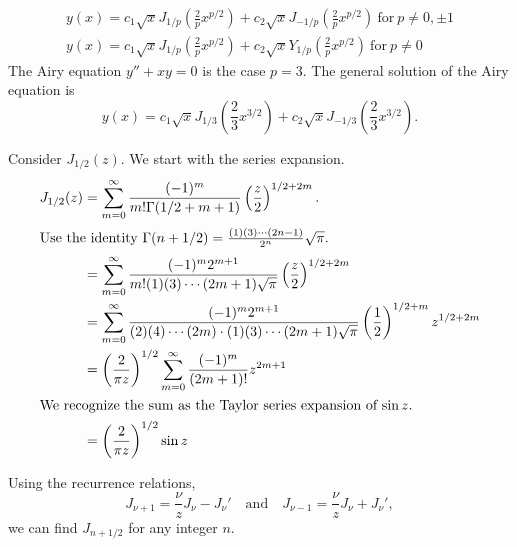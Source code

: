{\begin{Solution}
\begin{gather*}
    \boxed{
      y(x) = c_1 \sqrt{x} J_{1/p}\left( \frac{2}{p} x^{p/2} \right) 
      + c_2 \sqrt{x} J_{-1/p}\left( \frac{2}{p} x^{p/2} \right)\ \mathrm{for}\ p \neq 0,\pm 1
      }
    \\
    \boxed{
      y(x) = c_1 \sqrt{x} J_{1/p}\left( \frac{2}{p} x^{p/2} \right) 
      + c_2 \sqrt{x} Y_{1/p}\left( \frac{2}{p} x^{p/2} \right)\ \mathrm{for}\ p \neq 0
      }
  \end{gather*}
  The Airy equation $y'' + x y = 0$ is the case $p = 3$.  
  The general solution of the Airy equation is
  \[
  \boxed{
    y(x) = c_1 \sqrt{x} J_{1/3}\left( \frac{2}{3} x^{3/2} \right) 
    + c_2 \sqrt{x} J_{-1/3}\left( \frac{2}{3} x^{3/2} \right).
    }
  \]
\end{Solution}








\begin{Solution}
  Consider $J_{1/2}(z)$.  We start with the series expansion.
  \begin{align*}
    J_{1/2}(z)
    &= \sum_{m = 0}^\infty \frac{(-1)^m}{m! \Gamma(1/2 + m + 1)} \left( \frac{z}{2}
    \right)^{1/2 + 2m}. 
    \\
    \intertext{Use the identity $\Gamma(n+1/2) = \frac{(1)(3)\cdots(2n-1)}{2^n}
      \sqrt{\pi}$.}
    &= \sum_{m = 0}^\infty \frac{(-1)^m 2^{m+1}}{m! (1)(3)\cdots(2m+1) \sqrt{\pi}}
    \left(\frac{z}{2}\right)^{1/2+2m} 
    \\
    &= \sum_{m = 0}^\infty \frac{(-1)^m 2^{m+1}}{(2)(4)\cdots(2m) \cdot (1)(3)\cdots
      (2m+1) \sqrt{\pi}} \left(\frac{1}{2} \right)^{1/2 + m} z^{1/2 + 2m} 
    \\
    &= \left( \frac{2}{\pi z} \right)^{1/2} \sum_{m = 0}^\infty \frac{(-1)^m}{(2m+1)!} z^{2m+1} 
    \\
    \intertext{We recognize the sum as the Taylor series expansion of 
      $\sin z$.}
    &= \left( \frac{2}{\pi z} \right)^{1/2} \sin z
  \end{align*}

  Using the recurrence relations,
  \[ 
  J_{\nu+1} = \frac{\nu}{z} J_\nu - J_\nu' \quad \mathrm{and} \quad
  J_{\nu-1} = \frac{\nu}{z} J_\nu + J_\nu', 
  \]
  we can find $J_{n+1/2}$ for any integer $n$.


\end{Solution}}
